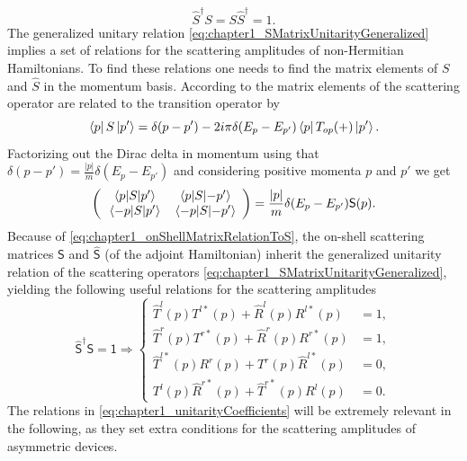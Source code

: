 %
\begin{equation}
  \widehat{S}^\dagger S = S\widehat{S}^\dagger= 1.
  \label{eq:chapter1_SMatrixUnitarityGeneralized}
\end{equation}
%
The generalized unitary relation \eqref{eq:chapter1_SMatrixUnitarityGeneralized} implies a set of relations for the scattering amplitudes of non-Hermitian Hamiltonians. To find these relations one needs to find the matrix elements of $S$ and $\widehat{S}$ in the momentum basis. According to \cite{Muga2004} the matrix elements of the scattering operator are related to the transition operator by
%
\begin{equation}
    \bra{p} S \ket{p'} = \delta (p-p') -2 i \pi \delta (E_p-E_{p'}) \bra{p}T_{op}(+)\ket{p'}.
    \label{eq:SmatrixElements}
\end{equation}
%
Factorizing out the Dirac delta in momentum using that $\delta(p-p') = \frac{|p|}{m}\delta(E_{p}-E_{p'})$ and considering positive momenta $p$ and $p'$ we get
%
\begin{equation}
  \left(
  \begin{array}{cc}
    \mel{p}{S}{p'} & \mel{p}{S}{-p'}\\
    \mel{-p}{S}{p'} & \mel{-p}{S}{-p'}
  \end{array}
  \right)
  = \frac{|p|}{m}\delta(E_{p}-E_{p'})\mathsf{S}(p).
  \label{eq:chapter1_onShellMatrixRelationToS}
\end{equation}
%
Because of \eqref{eq:chapter1_onShellMatrixRelationToS}, the on-shell scattering matrices $\mathsf{S}$ and $\mathsf{\widehat{S}}$ (of the adjoint Hamiltonian) inherit the generalized unitarity relation of the scattering operators \eqref{eq:chapter1_SMatrixUnitarityGeneralized}, yielding the following useful relations for the scattering amplitudes
%
\begin{equation}
  \mathsf{\widehat{S}}^\dagger\mathsf{S} = \mathsf{1}
  \Longrightarrow
  \begin{cases}
    \widehat T^l(p) T^{l*}(p) + \widehat R^l(p) R^{l*}(p) &= 1,
    \\
    \widehat T^r(p) T^{r*}(p) + \widehat R^r(p) R^{r*}(p) &= 1,
    \\
    \widehat T^{l*}(p) R^r(p) + T^r(p) \widehat R^{l*}(p) &= 0,
    \\
    T^l(p) \widehat R^{r*}(p) + \widehat T^{r*}(p) R^l(p) &= 0.
  \end{cases}
  \label{eq:chapter1_unitarityCoefficients}
\end{equation}
%
The relations in \eqref{eq:chapter1_unitarityCoefficients} will be extremely relevant in the following, as they set extra conditions for the scattering amplitudes of asymmetric devices.

